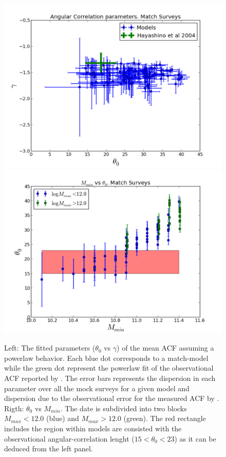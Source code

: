 \documentclass[usenatbib]{mn2e}
\begin{document}
\begin{figure}
\begin{center}
\includegraphics[width=0.46\linewidth,angle=0]{./plots/power_law_correlation.pdf}
\hspace{5mm}
\includegraphics[width=0.46\linewidth,angle=0]{./plots/mmin_vs_correlation.pdf}
\end{center}
\caption{Left: The fitted parameters  ($\theta_{0}$ vs $\gamma$) of the 
mean ACF  assuming a powerlaw behavior. Each blue dot corresponds to a
match-model while the green dot represent the powerlaw fit of the observational
ACF reported by \citet{Hayashino2004}.  The error bars represents the dispersion
in each parameter over all the mock surveys for a given model and dispersion due
to the observational error for the measured ACF by \citet{Hayashino2004}. Rigth: 
$\theta_{0}$ vs $M_{min}$. The date is subdivided into two blocks $M_{max}<12.0$ 
(blue) and $M_{max}>12.0$ (green). The red rectangle includes the region within
models are consisted with the observational angular-correlation lenght
($15<\theta_{0}<23$) as it can be deduced from the left
panel. \label{figure:correlation_parameters}} 
\end{figure} 

\end{document}
